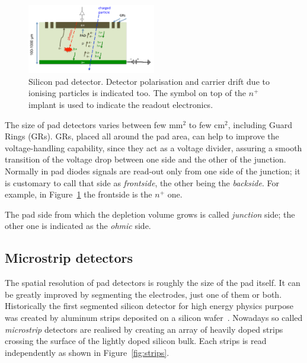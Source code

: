 \begin{figure}[!htbp]
   \centering
   \includegraphics[width=0.5\textwidth]{pad.pdf} 
      \caption{\label{fig:pad} Silicon pad detector. Detector polarisation and carrier drift due to 
      ionising particles is indicated too. The symbol on top of the $n^+$ implant is used to indicate the 
      readout electronics.}
\end{figure}
The size of pad detectors varies between few mm$^2$ to few cm$^2$,
including Guard Rings (GRs).  GRs, placed all
around the pad area, can help to improve the voltage-handling capability, since they act as a 
voltage divider, assuring a smooth transition of the voltage drop between one side 
and the other of the junction. 
Normally in pad diodes signals are read-out only from one side of the junction; it is customary 
to call that side as {\it frontside}, the other being the {\it backside}. 
For example, in Figure~\ref{fig:pad} the 
frontside is the $n^+$ one.

The pad side from which the depletion volume grows is called {\it junction} side; the other 
one is indicated as the {\it ohmic} side.

\subsection{Microstrip detectors}
\label{sec:microstrips}
The spatial resolution of pad detectors is roughly the size of the pad itself.
 It can be greatly improved by segmenting the electrodes, just one of 
them or both. 
  Historically the first segmented silicon detector for high energy physics purpose was created by 
 aluminum strips deposited on a silicon wafer~\cite{Amendolia}. 
Nowadays so called {\it microstrip} detectors are realised by creating an array of heavily doped 
strips crossing the surface 
 of the lightly doped silicon bulk. Each strips is read independently as shown in Figure~\ref{fig:strips}.
 
